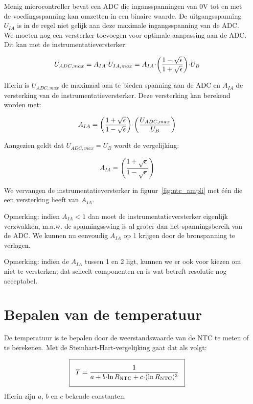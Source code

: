 \documentclass[12pt,a4paper,final,twoside,fleqn]{article}
\newcommand{\rntc}{R_\text{NTC}}
\let\oldcdot\cdot
\renewcommand{\cdot}{\kern-.10em\oldcdot\kern-.10em}
\begin{document}
Menig microcontroller bevat een ADC die ingansspanningen van 0V tot en met de
voedingsspanning kan omzetten in een binaire waarde. De uitgangsspanning $U_{IA}$
is in de regel niet gelijk aan deze maximale ingangsspanning van de ADC. We moeten
nog een versterker toevoegen voor optimale aanpassing aan de ADC. Dit kan met
de instrumentatieversterker:

\begin{equation}
U_{ADC,max} = A_{IA}\cdot U_{IA,max} = A_{IA}\cdot \left(\dfrac{1-\sqrt{\epsilon}}{1+\sqrt{\epsilon}}\right)\cdot U_B
\end{equation}

Hierin is $U_{ADC,max}$ de maximaal aan te bieden spanning aan de ADC en $A_{IA}$ de
versterking van de instrumentatieversterker. Deze versterking
kan berekend worden met:

\begin{equation}
A_{IA} = \left(\dfrac{1+\sqrt{\epsilon}}{1-\sqrt{\epsilon}}\right)\cdot
\left( \dfrac{U_{ADC,max}}{U_B}\right)
\end{equation}

Aangezien geldt dat $U_{ADC,max} = U_B$ wordt de vergelijking:

\begin{equation}
A_{IA} = \left(\dfrac{1+\sqrt{\epsilon}}{1-\sqrt{\epsilon}}\right)%
\end{equation}


We vervangen de instrumentatieversterker in figuur~\ref{fig:ntc_ampli} met
\'e\'en die een versterking heeft van $A_{IA}$.

Opmerking: indien $A_{IA} < 1$ dan moet de instrumentatieversterker eigenlijk
verzwakken, m.a.w. de spanningsswing is al groter dan het spanningsbereik van
de ADC. We kunnen nu eenvoudig $A_{IA}$ op 1 krijgen door de bronspanning te
verlagen.

Opmerking: indien de $A_{IA}$ tussen 1 en 2 ligt, kunnen we er ook voor kiezen
om niet te versterken; dat scheelt componenten en is wat betreft resolutie nog
acceptabel.



\clearpage
\section{Bepalen van de temperatuur}
De temperatuur is te bepalen door de weerstandswaarde van de NTC te meten of te
berekenen.
Met de Steinhart-Hart-vergelijking gaat dat als volgt:

\begin{equation}
\label{equ:invertedsteinharthart}
\setlength\fboxsep{2ex}
\boxed{T = \dfrac{1}{a + b\cdot\ln \rntc + c\cdot( \ln \rntc )^3}}
\end{equation}
Hierin zijn $a$, $b$ en $c$ bekende constanten.
\end{document}
